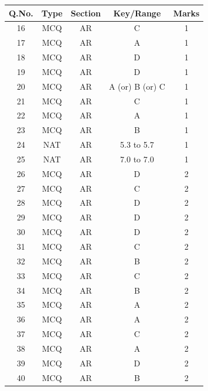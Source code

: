 \documentclass[journal,12pt,onecolumn]{IEEEtran}
\theoremstyle{remark}
\begin{document}
\newpage
\renewcommand{\arraystretch}{2.2} %
\setlength{\tabcolsep}{20pt} %
\hspace{1.5cm}
\begin{tabular}{|c|c|c|c|c|}
\hline
\rowcolor{orange!30}
Q.No. & Type & Section & Key/Range & Marks \\
\hline
16 & MCQ & AR & C & 1 \\
\hline
17 & MCQ & AR & A & 1 \\
\hline
18 & MCQ & AR & D & 1 \\
\hline
19 & MCQ & AR & D & 1 \\
\hline
20 & MCQ & AR & A (or) B (or) C & 1 \\
\hline
21 & MCQ & AR & C & 1 \\
\hline
22 & MCQ & AR & A & 1 \\
\hline
23 & MCQ & AR & B & 1 \\
\hline
24 & NAT & AR & 5.3 to 5.7 & 1 \\
\hline
25 & NAT & AR & 7.0 to 7.0 & 1 \\
\hline
26 & MCQ & AR & D & 2 \\
\hline
27 & MCQ & AR & C & 2 \\
\hline
28 & MCQ & AR & D & 2 \\
\hline
29 & MCQ & AR & D & 2 \\
\hline
30 & MCQ & AR & D & 2 \\
\hline
31 & MCQ & AR & C & 2 \\
\hline
32 & MCQ & AR & B & 2 \\
\hline
33 & MCQ & AR & C & 2 \\
\hline
34 & MCQ & AR & B & 2 \\
\hline
35 & MCQ & AR & A & 2 \\
\hline
36 & MCQ & AR & A & 2 \\
\hline
37 & MCQ & AR & C & 2 \\
\hline
38 & MCQ & AR & A & 2 \\
\hline
39 & MCQ & AR & D & 2 \\
\hline
40 & MCQ & AR & B & 2 \\
\hline
\end{tabular}

\newpage
\end{document}
